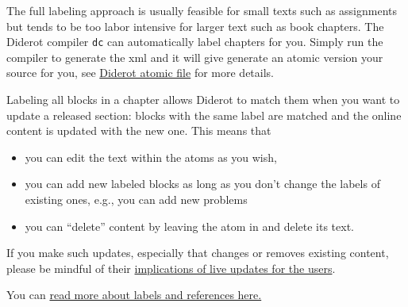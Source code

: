 \begin{important}
The full labeling approach is usually feasible for small texts such as assignments but tends to be too labor intensive for larger text such as book chapters.
%
The Diderot compiler \lstinline`dc` can  automatically label chapters for you.  Simply run the compiler to generate the xml and it will give generate an atomic version your source for you, see
 \href{grm:publisg::diderot-atomic}{Diderot atomic  file} 
%
for more details.
\end{important}

Labeling all blocks in a chapter allows Diderot to match them when you want to update a released section: blocks with the same label are matched and the online content is updated with the new one.
%
This means that 
\begin{itemize}

\item you can edit the text within the atoms as you wish,
%

\item you can add new labeled blocks as long as you don't change the labels of existing ones, e.g., you can add new problems

\item you can ``delete'' content by leaving the atom in and delete its text.
\end{itemize}
%
If you make such updates, especially that changes or removes existing content, 
please be mindful of their 
%
\href{grm:publish::released::user-implications}{implications of live updates for the users}.

\begin{note}
You can \href{sec:dc::labels-refs}{read more about labels and references here.}
\end{note}

